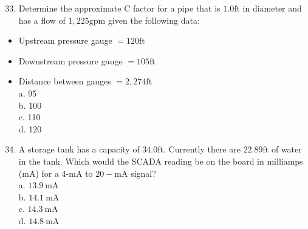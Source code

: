\documentclass[10pt]{article}
\begin{document}
\begin{enumerate}
  \setcounter{enumi}{32}
  \item Determine the approximate $\mathrm{C}$ factor for a pipe that is $1.0 \mathrm{ft}$ in diameter and has a flow of $1,225 \mathrm{gpm}$ given the following data:
\end{enumerate}

\begin{itemize}
  \item Upstream pressure gauge $=120 \mathrm{ft}$

  \item Downstream pressure gauge $=105 \mathrm{ft}$

  \item Distance between gauges $=2,274 \mathrm{ft}$\\
a. 95\\
b. 100\\
c. 110\\
d. 120

\end{itemize}

\begin{enumerate}
  \setcounter{enumi}{33}
  \item A storage tank has a capacity of $34.0 \mathrm{ft}$. Currently there are $22.89 \mathrm{ft}$ of water in the tank. Which would the SCADA reading be on the board in milliamps (mA) for a 4-mA to $20-\mathrm{mA}$ signal?\\
a. $13.9 \mathrm{~mA}$\\
b. $14.1 \mathrm{~mA}$\\
c. $14.3 \mathrm{~mA}$\\
d. $14.8 \mathrm{~mA}$
\end{enumerate}
\end{document}
